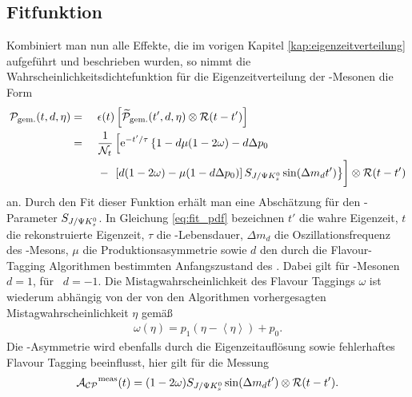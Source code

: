 \subsection{Fitfunktion}
Kombiniert man nun alle Effekte, die im vorigen Kapitel \ref{kap:eigenzeitverteilung} aufgeführt und beschrieben wurden, so nimmt die Wahrscheinlichkeitsdichtefunktion für die Eigenzeitverteilung der \Bd-Mesonen die Form
\begin{alignat}{3}
\nonumber\mathcal{P}_{\text{gem.}}(t, d, \eta) &=\  &&  \epsilon(t)\left[\widetilde{\mathcal{P}}_{\text{gem.}}(t', d, \eta) \otimes \mathcal{R}(t-t')\right]\\
\nonumber &= &&\frac{1}{\mathcal{N}_t}\left[\e^{-t'/\tau} \left\lbrace 1-d\mu(1-2\omega)-d\Delta p_0 \right.\right.\\
& &&-\left.\vphantom{\frac{1}{\mathcal{N}_t}}\left.\left[d(1-2\omega)-\mu(1-d\Delta p_0)\right]\SJPsi\sin(\Delta m_d t')\right\rbrace\right]\otimes\mathcal{R}(t-t') \label{eq:fit_pdf}
\end{alignat}
an. Durch den Fit dieser Funktion erhält man eine Abschätzung für den \CP-Parameter $S_{J/\Psi K_s^0}$. In Gleichung \ref{eq:fit_pdf} bezeichnen $t'$ die wahre Eigenzeit, $t$ die rekonstruierte Eigenzeit, $\tau$ die \Bd-Lebensdauer, $\Delta m_d$ die Oszillationsfrequenz des \Bd-Mesons, $\mu$ die Produktionsasymmetrie sowie $d$ den durch die Flavour-Tagging Algorithmen bestimmten Anfangszustand des \Bd. Dabei gilt für \Bd-Mesonen $d=1$, für \Bdbar\ $d=-1$. Die Mistagwahrscheinlichkeit des Flavour Taggings $\omega$ ist wiederum abhängig von der von den Algorithmen vorhergesagten Mistagwahrscheinlichkeit $\eta$ gemäß
\begin{align}
\omega(\eta) = p_1\left(\eta-\left\langle\eta\right\rangle\right) + p_0.
\end{align}
Die \CP-Asymmetrie wird ebenfalls durch die Eigenzeitauflösung sowie fehlerhaftes Flavour Tagging beeinflusst, hier gilt für die Messung \cite{lhcb-paper}
\begin{align}
\mathcal{A_{CP}}^{\text{meas}}(t) = (1-2\omega)S_{J/\Psi K_s^0} \sin(\Delta m_d t') \otimes \mathcal{R}(t-t'). \label{eq:cp_asymm_meas}
\end{align}


